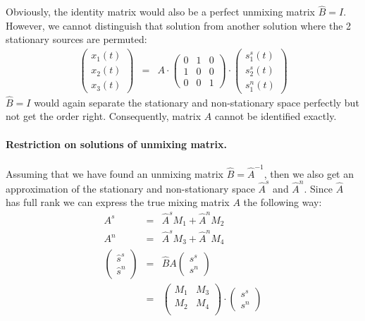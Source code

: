 \documentclass[a4paper, 12pt, titlepage]{article}
\begin{document}
Obviously, the identity matrix would also be a perfect unmixing matrix $\hat B = I$.
However, we cannot distinguish that solution from another solution where the 2 stationary sources are permuted:
\begin{eqnarray}
	\left(
		\begin{array}{c}
		x_1(t)\\
		x_2(t)\\
		x_3(t)		
		\end{array}
	\right) &=& A \cdot \left(
		\begin{array}{ccc}
		0&1&0\\
		1&0&0\\
		0&0&1
		\end{array}
	\right) \cdot \left(
		\begin{array}{c}
			s^s_1(t)\\
			s^s_2(t)\\
			s^n_1(t)
		\end{array}
	\right)
\end{eqnarray}
$\hat B=I$ would again separate the stationary and non-stationary space perfectly but not get the order right.
Consequently, matrix $A$ cannot be identified exactly.

\paragraph{Restriction on solutions of unmixing matrix.}
Assuming that we have found an unmixing matrix $\hat B = \hat A^{-1}$, then we also get an approximation of the stationary and non-stationary space $\hat A^s$ and $\hat A^n$. Since $\hat A$ has full rank we can express the true mixing matrix $A$ the following way:
\begin{eqnarray}
	A^s &=& \hat A^s M_1 + \hat A^n M_2\\
	A^n &=& \hat A^s M_3 + \hat A^n M_4\\
	\left(
		\begin{array}{c}
			\hat s^s\\
			\hat s^n 
		\end{array}
	\right) &=& \hat B A \left (
		\begin{array}{c}
			s^s\\
			s^n 
		\end{array}
	\right )\\
	&=& \left(
		\begin{array}{cc}
			M_1& M_3\\
			M_2 & M_4 \\
		\end{array}
	\right) \cdot \left(
		\begin{array}{c}
			s^s\\
			s^n
		\end{array}
	\right)
\end{eqnarray}
\end{document}
